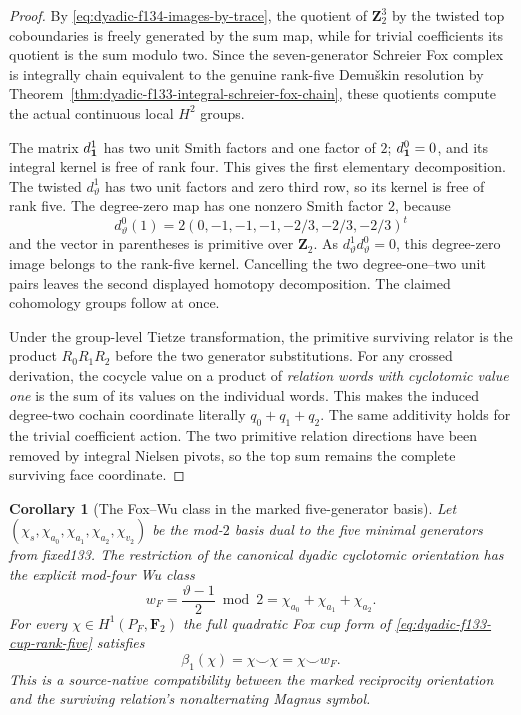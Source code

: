 \documentclass[11pt]{article}
\newtheorem{corollary}[theorem]{Corollary}
\theoremstyle{definition}
\begin{document}
\begin{proof}
By
\eqref{eq:dyadic-f134-images-by-trace},
the quotient of
$\mathbf Z_2^3$
by the twisted
top coboundaries
is freely generated
by the sum map,
while for trivial
coefficients its
quotient is the
sum modulo two.
Since the
seven-generator
Schreier Fox
complex is
integrally chain
equivalent to the
genuine rank-five
Demu\v{s}kin
resolution by
Theorem~\ref{thm:dyadic-f133-integral-schreier-fox-chain},
these quotients
compute the actual
continuous local
$H^2$ groups.

The matrix
$d_{\bf1}^1$
has two unit
Smith factors
and one factor
of $2$;
$d_{\bf1}^0=0$,
and its integral
kernel is
free of rank four.
This gives the
first elementary
decomposition.
The twisted
$d_\vartheta^1$
has two unit
factors and
zero third row,
so its kernel
is free of rank five.
The degree-zero
map has one
nonzero Smith
factor $2$,
because
\[
d_\vartheta^0(1)
=2(0,-1,-1,-1,-2/3,-2/3,-2/3)^t
\]
and the vector
in parentheses
is primitive
over $\mathbf Z_2$.
As $d_\vartheta^1
d_\vartheta^0=0$,
this degree-zero
image belongs
to the rank-five
kernel.
Cancelling the
two degree-one--two
unit pairs leaves
the second
displayed
homotopy decomposition.
The claimed
cohomology groups
follow at once.

Under the
group-level
Tietze transformation,
the primitive
surviving relator
is the product
$R_0R_1R_2$
before the two
generator substitutions.
For any crossed
derivation, the
cocycle value
on a product
of \emph{relation
words with
cyclotomic value one}
is the sum of
its values on the
individual words.
This makes the
induced degree-two
cochain coordinate
literally
$q_0+q_1+q_2$.
The same
additivity holds
for the trivial
coefficient action.
The two primitive
relation directions
have been
removed by
integral Nielsen
pivots, so the
top sum remains
the complete
surviving face
coordinate.
\end{proof}

\begin{corollary}[The Fox--Wu class in the marked five-generator basis]
\label{cor:dyadic-f134-marked-wu}
Let
$(\chi_s,\chi_{a_0},
\chi_{a_1},\chi_{a_2},
\chi_{v_2})$
be the mod-$2$
basis dual to
the five
minimal generators
from fixed133.
The restriction of
the canonical
dyadic cyclotomic
orientation
has the explicit
mod-four Wu class
\begin{equation}\label{eq:dyadic-f134-marked-wu-class}
\boxed{\qquad
w_F=
\frac{\vartheta-1}{2}\bmod2
=\chi_{a_0}+
\chi_{a_1}+\chi_{a_2}.
\qquad}
\end{equation}
For every
$\chi\in H^1(P_F,\mathbf F_2)$
the full quadratic
Fox cup form of
\eqref{eq:dyadic-f133-cup-rank-five}
satisfies
\begin{equation}\label{eq:dyadic-f134-fox-wu-compatibility}
\boxed{\qquad
\beta_1(\chi)=
\chi\smile\chi=
\chi\smile w_F.
\qquad}
\end{equation}
This is a
source-native
compatibility
between the
marked reciprocity
orientation and
the surviving
relation's
nonalternating
Magnus symbol.
\end{corollary}
\end{document}
